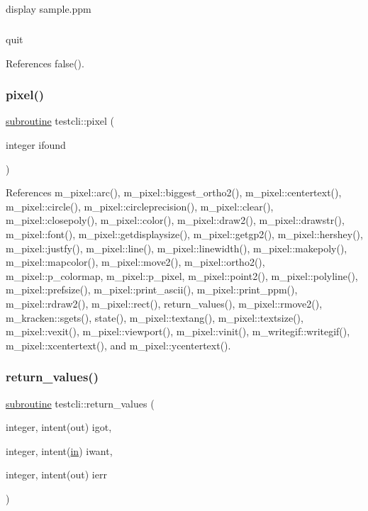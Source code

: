 display sample.\+ppm \subparagraph*{}

quit 

References false().

\mbox{\label{shell_8f90_a5c599e945a5e0c9c8954969ea48587cf}} 
\subsubsection{\texorpdfstring{pixel()}{pixel()}}
{\footnotesize\ttfamily \hyperlink{M__stopwatch_83_8txt_acfbcff50169d691ff02d4a123ed70482}{subroutine} testcli\+::pixel (\begin{DoxyParamCaption}\item[{integer}]{ifound }\end{DoxyParamCaption})}



References m\+\_\+pixel\+::arc(), m\+\_\+pixel\+::biggest\+\_\+ortho2(), m\+\_\+pixel\+::centertext(), m\+\_\+pixel\+::circle(), m\+\_\+pixel\+::circleprecision(), m\+\_\+pixel\+::clear(), m\+\_\+pixel\+::closepoly(), m\+\_\+pixel\+::color(), m\+\_\+pixel\+::draw2(), m\+\_\+pixel\+::drawstr(), m\+\_\+pixel\+::font(), m\+\_\+pixel\+::getdisplaysize(), m\+\_\+pixel\+::getgp2(), m\+\_\+pixel\+::hershey(), m\+\_\+pixel\+::justfy(), m\+\_\+pixel\+::line(), m\+\_\+pixel\+::linewidth(), m\+\_\+pixel\+::makepoly(), m\+\_\+pixel\+::mapcolor(), m\+\_\+pixel\+::move2(), m\+\_\+pixel\+::ortho2(), m\+\_\+pixel\+::p\+\_\+colormap, m\+\_\+pixel\+::p\+\_\+pixel, m\+\_\+pixel\+::point2(), m\+\_\+pixel\+::polyline(), m\+\_\+pixel\+::prefsize(), m\+\_\+pixel\+::print\+\_\+ascii(), m\+\_\+pixel\+::print\+\_\+ppm(), m\+\_\+pixel\+::rdraw2(), m\+\_\+pixel\+::rect(), return\+\_\+values(), m\+\_\+pixel\+::rmove2(), m\+\_\+kracken\+::sgets(), state(), m\+\_\+pixel\+::textang(), m\+\_\+pixel\+::textsize(), m\+\_\+pixel\+::vexit(), m\+\_\+pixel\+::viewport(), m\+\_\+pixel\+::vinit(), m\+\_\+writegif\+::writegif(), m\+\_\+pixel\+::xcentertext(), and m\+\_\+pixel\+::ycentertext().

\mbox{\label{shell_8f90_a8e1579319e153f8b8d77b94fa94e9b37}} 
\subsubsection{\texorpdfstring{return\+\_\+values()}{return\_values()}}
{\footnotesize\ttfamily \hyperlink{M__stopwatch_83_8txt_acfbcff50169d691ff02d4a123ed70482}{subroutine} testcli\+::return\+\_\+values (\begin{DoxyParamCaption}\item[{integer, intent(out)}]{igot,  }\item[{integer, intent(\hyperlink{M__journal_83_8txt_afce72651d1eed785a2132bee863b2f38}{in})}]{iwant,  }\item[{integer, intent(out)}]{ierr }\end{DoxyParamCaption})}

